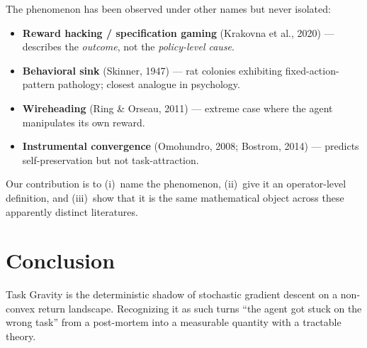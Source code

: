 \documentclass[10pt]{article}
\begin{document}
The phenomenon has been observed under other names but never isolated:

\begin{itemize}
  \item \textbf{Reward hacking / specification gaming} (Krakovna et al.,
        2020) --- describes the \emph{outcome}, not the \emph{policy-level cause}.
  \item \textbf{Behavioral sink} (Skinner, 1947) --- rat colonies
        exhibiting fixed-action-pattern pathology; closest analogue
        in psychology.
  \item \textbf{Wireheading} (Ring \& Orseau, 2011) --- extreme case
        where the agent manipulates its own reward.
  \item \textbf{Instrumental convergence} (Omohundro, 2008;
        Bostrom, 2014) --- predicts self-preservation but not
        task-attraction.
\end{itemize}

Our contribution is to (i)~name the phenomenon, (ii)~give it an
operator-level definition, and (iii)~show that it is the same
mathematical object across these apparently distinct literatures.

\section{Conclusion}

Task Gravity is the deterministic shadow of stochastic gradient
descent on a non-convex return landscape. Recognizing it as such
turns ``the agent got stuck on the wrong task'' from a post-mortem
into a measurable quantity with a tractable theory.
\end{document}
